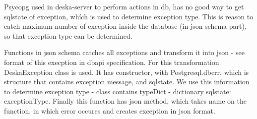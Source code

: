 \documentclass[deska]{subfiles}
\begin{document}
Psycopg used in deska-server to perform actions in db, has no good way to get sqlstate of exception, whích is used to determine exception type.
This is reason to catch maximum number of exception inside the database (in json schema part), so that exception type can be determined.

Functions in json schema catches all exceptions and transform it into json - see format of this execption in dbapi specification.
For this transformation DeskaException class is used. It has constructor, with Postgresql.dberr, which is structure that contains exception
message, and sqlstate. We use this information to determine exception type - class contains typeDict - dictionary {sqlstate: exceptionType}.
Finally this function has json method, which takes name on the function, in which error occures and creates exception in json format.
\end{document}
